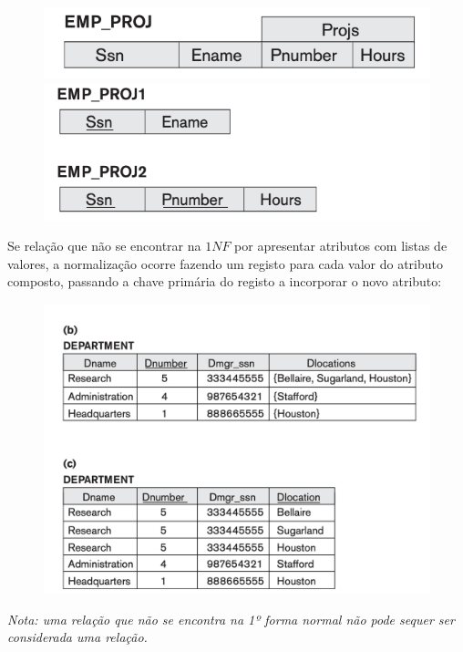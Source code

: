 \documentclass[oneside]{book}
\theoremstyle{definition}
\begin{document}
\begin{figure}[h]
    \centering
    \includegraphics[scale = 0.6]{cap_norm/1nf_1.png}
    \hspace*{1em}
    \includegraphics[scale = 0.6]{cap_norm/1nf_2.png}
\end{figure}

Se relação que não se encontrar na $1NF$ por apresentar atributos com listas de valores, a normalização ocorre fazendo um registo para cada valor do atributo composto, passando a chave primária do registo a incorporar o novo atributo:

\begin{figure}[h]
    \centering
    \includegraphics[scale = 0.4]{cap_norm/1nf_3.png}
\end{figure}

\textit{Nota: uma relação que não se encontra na 1º forma normal não pode sequer ser considerada uma relação.}
\end{document}
